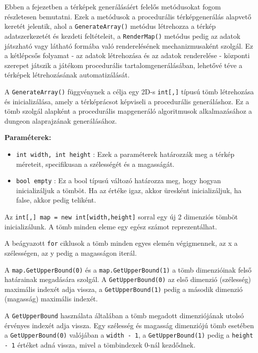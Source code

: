 
Ebben a fejezetben a térképek generálásáért felelős metódusokat fogom részletesen bemutatni. Ezek a metódusok a procedurális térképgenerálás alapvető keretét jelentik, ahol a \texttt{GenerateArray()} metódus létrehozza a térkép adatszerkezetét és kezdeti feltételeit, a \texttt{RenderMap()} metódus pedig az adatok játszható vagy látható formába való renderelésének mechanizmusaként szolgál. Ez a kétlépcsős folyamat - az adatok létrehozása és az adatok renderelése - központi szerepet játszik a játékom procedurális tartalomgenerálásában, lehetővé téve a térképek létrehozásának automatizálását.


A \texttt{GenerateArray()} függvénynek a célja egy 2D-s \texttt{int[,]} típusú tömb létrehozása és inicializálása, amely a térképrácsot képviseli a procedurális generáláshoz. Ez a tömb szolgál alapként a procedurális mapgeneráló algoritmusok alkalmazásához a dungeon alaprajzának generálásához.

\textbf{Paraméterek:}
\begin{itemize}
\item \texttt{int width, int height} : Ezek a paraméterek határozzák meg a térkép méreteit, specifikusan a szélességét és a magasságát.
\item \texttt{bool empty} : Ez a bool típusú változó határozza meg, hogy hogyan inicializáljuk a tömböt. Ha az értéke igaz, akkor üresként inicializáljuk, ha false, akkor pedig teliként.
\end{itemize}

Az \texttt{int[,] map = new int[width,height]} sorral egy új 2 dimenziós tömböt inicializálunk. A tömb minden eleme egy egész számot reprezentálhat.

A beágyazott \texttt{for} ciklusok a tömb minden egyes elemén végigmennek, az x a szélességen, az y pedig a magasságon iterál.

 A \texttt{map.GetUpperBound(0)} és a \texttt{map.GetUpperBound(1)} a tömb dimenzióinak felső határainak megadására szolgál. A \texttt{GetUpperBound(0)} az első dimenzió (szélesség) maximális indexét adja vissza, a \texttt{GetUpperBound(1)} pedig a második dimenzió (magasság) maximális indexét.

A \texttt{GetUpperBound} használata általában a tömb megadott dimenziójának utolsó érvényes indexét adja vissza. Egy szélesség és magasság dimenziójú tömb esetében a \texttt{GetUpperBound(0)} valójában a \texttt{width - 1}, a \texttt{GetUpperBound(1)} pedig a \texttt{height - 1} értéket adná vissza, mivel a tömbindexek 0-nál kezdődnek.

